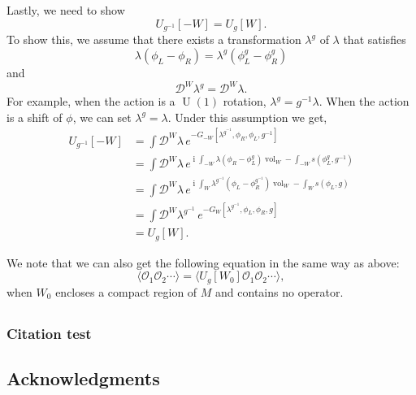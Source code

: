 \documentclass[11pt,toc=bibliography]{scrbook}
\DeclareMathOperator{\vol}{vol}
\DeclareMathOperator{\U}{U}
\DeclareMathOperator{\imunit}{i}
\numberwithin{equation}{section}
\begin{document}
Lastly, we need to show
\begin{equation}
U_{g^{-1}}[-W] = U_g[W].
\label{eq-Udual-inverse}
\end{equation}
To show this, we assume that there exists a transformation $\lambda^g$ of $\lambda$ that satisfies
\begin{equation}
\lambda(\phi_L-\phi_R) = \lambda^{g}(\phi_L^{g}-\phi_R^{g})
\end{equation}
and
\begin{equation}
\mathcal{D}^W\lambda^g = \mathcal{D}^W\lambda.
\end{equation}
For example, when the action is a $\U(1)$ rotation, $\lambda^g = g^{-1}\lambda$.
When the action is a shift of $\phi$, we can set $\lambda^g = \lambda$.
Under this assumption we get,
\begin{equation}
\begin{split}
U_{g^{-1}}[-W] &= \int\mathcal{D}^W \lambda \, e^{-G_{-W}[\lambda^{g^{-1}},\phi_R,\phi_L,g^{-1}]}\\
&= \int\mathcal{D}^W \lambda \, e^{\imunit\int_{-W}\lambda(\phi_R-\phi_L^{g})\vol_W - \int_{-W}s(\phi_L^{g},g^{-1})}\\
&= \int\mathcal{D}^W \lambda \, e^{\imunit\int_{W}\lambda^{g^{-1}}(\phi_L-\phi_R^{g^{-1}})\vol_W - \int_{W}s(\phi_L,g)}\\
&= \int\mathcal{D}^W \lambda^{g^{-1}} \, e^{-G_W[\lambda^{g^{-1}},\phi_L,\phi_R,g]}\\
&= U_g[W].
\end{split}
\end{equation}

We note that we can also get the following equation in the same way as above:
\begin{equation}
\langle \mathcal{O}_1 \mathcal{O}_2 \cdots \rangle = \langle U_g[W_0] \mathcal{O}_1 \mathcal{O}_2 \cdots \rangle,
\label{eq-bubble}
\end{equation}
when $W_0$ encloses a compact region of $M$ and contains no operator.

\subsection{}

\subsubsection*{Citation test}
\cite{Barkeshli:2014cna}
\subsection*{Acknowledgments}



\end{document}
